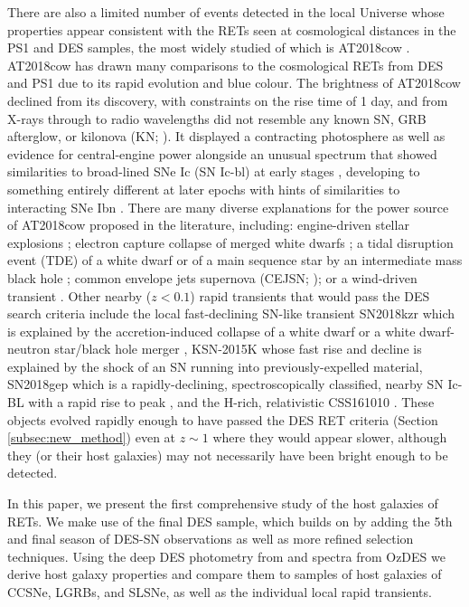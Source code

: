 \documentclass[fleqn,usenatbib,]{mnras}
\newcommand{\replyref}[1]{\color{magenta}#1 \color{black}}
\begin{document}
There are also a limited number of events detected in the local Universe whose properties appear consistent with the RETs seen at cosmological distances in the PS1 and DES samples, the most widely studied of which is AT2018cow \citep[e.g.][]{Prentice2018,Margutti2019,Perley2019}. \replyref{AT2018cow has drawn many comparisons to the cosmological RETs from DES and PS1 \citep[e.g.][]{Perley2019,Margutti2019,Fox2019,Mohan2020} due to its rapid evolution and blue colour. The brightness of AT2018cow declined from its discovery, with constraints on the rise time of 1 day, and from X-rays through to radio wavelengths did not resemble any known SN, GRB afterglow, or kilonova (KN; \citealt{Ho2019}). It displayed a contracting photosphere as well as evidence for central-engine power alongside an unusual spectrum that showed similarities to broad-lined SNe Ic (SN Ic-bl) at early stages \citep[e.g.][]{Xu2018,Izzo2018}, developing to something entirely different at later epochs \citep{Perley2019} with hints of similarities to interacting SNe Ibn \citep{Fox2019}.} There are many diverse explanations for the power source of AT2018cow \replyref{proposed} in the literature, including: \replyref{engine-driven stellar explosions \citep{Ho2019,Margutti2019,Mohan2020}}; electron capture collapse of merged white dwarfs \citep{Lyutikov2019}; a tidal disruption event (TDE) of a white dwarf \citep{Kuin2019} or of a main sequence star by an intermediate mass black hole \citep{Perley2019}; common envelope jets supernova (CEJSN; \citealt{Soker2019}); or a wind-driven transient \citep{Piro2020,Uno2020}.
Other nearby \replyref{($z<0.1$)} rapid transients \replyref{that would pass the DES search criteria} include the local fast-declining SN-like transient SN2018kzr \citep{McBrien2019} which is explained by the accretion-induced collapse of a white dwarf or a white dwarf-neutron star/\replyref{black hole} merger \citep{Gillanders2020}, KSN-2015K \citep{Rest2018} whose fast rise and decline is explained by the shock of an SN running into previously-expelled material, \replyref{SN2018gep \citep{Ho2019a} \replyref{which is a rapidly-declining, spectroscopically classified, nearby SN Ic-BL with a rapid rise to peak}, and the H-rich, relativistic CSS161010 \citep{Coppejans2020}.} \replyref{These objects evolved rapidly enough to have passed the DES RET criteria (Section \ref{subsec:new_method}) even at $z\sim1$ where they would appear slower, although they (or their host galaxies) may not necessarily have been bright enough to be detected.}

In this paper, we present the first comprehensive study of the host galaxies of RETs. We make use of the final DES sample, which builds on  by adding the 5th and final season of DES-SN observations as well as more refined selection techniques. Using the deep DES photometry from \citet[hereafter W20]{Wiseman2020} and spectra from OzDES \citep{Lidman2020} we derive host galaxy properties and compare them to samples of host galaxies of CCSNe, LGRBs, and SLSNe, as well as the individual local rapid transients. 
\end{document}
